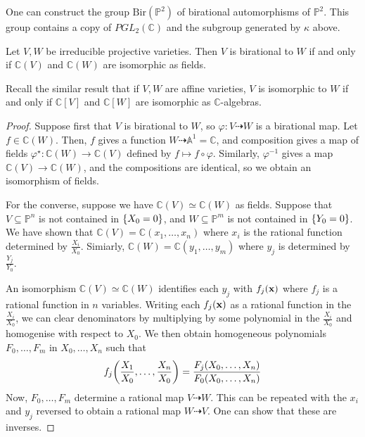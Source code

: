 \begin{remark}
    One can construct the group \( \mathrm{Bir}(\mathbb P^2) \) of birational automorphisms of \( \mathbb P^2 \).
    This group contains a copy of \( PGL_2(\mathbb C) \) and the subgroup generated by \( \kappa \) above.
\end{remark}
\begin{theorem}
    Let \( V, W \) be irreducible projective varieties.
    Then \( V \) is birational to \( W \) if and only if \( \mathbb C(V) \) and \( \mathbb C(W) \) are isomorphic as fields.
\end{theorem}
Recall the similar result that if \( V, W \) are affine varieties, \( V \) is isomorphic to \( W \) if and only if \( \mathbb C[V] \) and \( \mathbb C[W] \) are isomorphic as \( \mathbb C \)-algebras.
\begin{proof}
    Suppose first that \( V \) is birational to \( W \), so \( \varphi \colon V \dashrightarrow W \) is a birational map.
    Let \( f \in \mathbb C(W) \).
    Then, \( f \) gives a function \( W \dashrightarrow \mathbb A^1 = \mathbb C \), and composition gives a map of fields \( \varphi^\star \colon \mathbb C(W) \to \mathbb C(V) \) defined by \( f \mapsto f \circ \varphi \).
    Similarly, \( \varphi^{-1} \) gives a map \( \mathbb C(V) \to \mathbb C(W) \), and the compositions are identical, so we obtain an isomorphism of fields.

    For the converse, suppose we have \( \mathbb C(V) \simeq \mathbb C(W) \) as fields.
    Suppose that \( V \subseteq \mathbb P^n \) is not contained in \( \qty{X_0 = 0} \), and \( W \subseteq \mathbb P^m \) is not contained in \( \qty{Y_0 = 0} \).
    We have shown that \( \mathbb C(V) = \mathbb C(x_1, \dots, x_n) \) where \( x_i \) is the rational function determined by \( \frac{X_i}{X_0} \).
    Simiarly, \( \mathbb C(W) = \mathbb C(y_1, \dots, y_m) \) where \( y_j \) is determined by \( \frac{Y_j}{Y_0} \).

    An isomorphism \( \mathbb C(V) \simeq \mathbb C(W) \) identifies each \( y_j \) with \( f_j(\vb x) \) where \( f_j \) is a rational function in \( n \) variables.
    Writing each \( f_j(\vb x) \) as a rational function in the \( \frac{X_i}{X_0} \), we can clear denominators by multiplying by some polynomial in the \( \frac{X_i}{X_0} \) and homogenise with respect to \( X_0 \).
    We then obtain homogeneous polynomials \( F_0, \dots, F_m \) in \( X_0, \dots, X_n \) such that
    \[ f_j\qty(\frac{X_1}{X_0}, \dots, \frac{X_n}{X_0}) = \frac{F_j(X_0, \dots, X_n)}{F_0(X_0, \dots, X_n)} \]
    Now, \( F_0, \dots, F_m \) determine a rational map \( V \dashrightarrow W \).
    This can be repeated with the \( x_i \) and \( y_j \) reversed to obtain a rational map \( W \dashrightarrow V \).
    One can show that these are inverses.
\end{proof}
